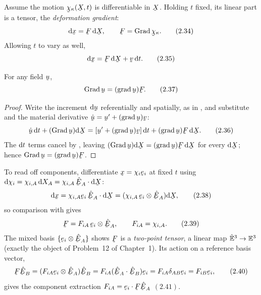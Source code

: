 Assume the motion $\bchi_\kappa(\bX,t)$ is differentiable in $\bX$. Holding
$t$ fixed, its linear part is a tensor, the \emph{deformation gradient}:
\begin{equation}
   \dl\bx=\bF\,\dl\bX,\qquad \bF=\Grad\bchi_\kappa. \tag{2.34}\label{eq:2.34}
\end{equation}
Allowing $t$ to vary as well,
\begin{equation}
   \dl\bx=\bF\,\dl\bX+\bv\,\dl t. \tag{2.35}\label{eq:2.35}
\end{equation}

\begin{theorem}\label{thm:GradgradF}
For any field $\bu$,
\begin{equation}
   \Grad\bu=(\grad\bu)\bF. \tag{2.37}\label{eq:2.37}
\end{equation}
\end{theorem}

\begin{proof}
Write the increment $\dl\bu$ referentially and spatially, as in ,
and substitute  and the material derivative $\dot\bu=\bu'+(\grad\bu)\bv$:
\begin{equation}
   \dot\bu\,\dl t+(\Grad\bu)\dl\bX
   =[\bu'+(\grad\bu)\bv]\,\dl t+(\grad\bu)\bF\,\dl\bX. \tag{2.36}\label{eq:2.36}
\end{equation}
The $\mathrm{d} t$ terms cancel by , leaving
$(\Grad\bu)\dl\bX=(\grad\bu)\bF\,\dl\bX$ for every $\dl\bX$; hence
$\Grad\bu=(\grad\bu)\bF$.
\end{proof}

To read off components, differentiate $\bx=\chi_i\be_i$ at fixed $t$ using
$\dl\chi_i=\chi_{i,A}\,\dl X_A=\chi_{i,A}\,\ip{\hbE_A}{\dl\bX}$:
\begin{equation}
   \dl\bx=\chi_{i,A}\be_i\,\ip{\hbE_A}{\dl\bX}
   =(\chi_{i,A}\,\be_i\otimes\hbE_A)\dl\bX, \tag{2.38}\label{eq:2.38}
\end{equation}
so comparison with  gives
\begin{equation}
   \bF=F_{iA}\,\be_i\otimes\hbE_A,\qquad F_{iA}=\chi_{i,A}. \tag{2.39}\label{eq:2.39}
\end{equation}
The mixed basis $\{\be_i\otimes\hbE_A\}$ shows $\bF$ is a \emph{two-point
tensor}, a linear map $\hat{\mathbb{E}}^{3}\to\mathbb{E}^{3}$ (exactly the object of Problem~12 of
Chapter~1). Its action on a reference basis vector,
\begin{equation}
   \bF\hbE_B=(F_{iA}\be_i\otimes\hbE_A)\hbE_B
   =F_{iA}(\ip{\hbE_A}{\hbE_B})\be_i=F_{iA}\dd_{AB}\be_i=F_{iB}\be_i, \tag{2.40}\label{eq:2.40}
\end{equation}
gives the component extraction $F_{iA}=\ip{\be_i}{\bF\hbE_A}$ $(2.41)$.

